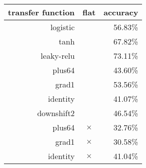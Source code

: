 \begin{tabular}{rcr}
{\bf transfer function} & {\bf flat} & {\bf accuracy} \\
\hline 
logistic &   & 56.83\% \\
tanh &   & 67.82\% \\
leaky-relu &   & 73.11\% \\
plus64 &   & 43.60\% \\
grad1 &   & 53.56\% \\
identity &   & 41.07\% \\
downshift2 &   & 46.54\% \\
plus64 & $\times$ & 32.76\% \\
grad1 & $\times$ & 30.58\% \\
identity & $\times$ & 41.04\% \\
\end{tabular}
